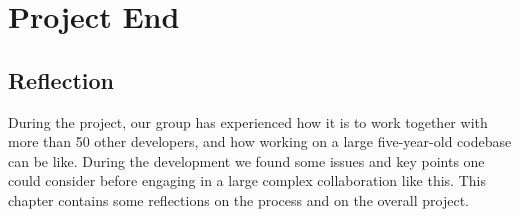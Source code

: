 \part{Project End}
\chapter{Reflection}
\label{cha:reflection}

During the \giraf project, our group has experienced how it is to work together with more than 50 other developers, and how working on a large five-year-old codebase can be like. During the development we found some issues and key points one could consider before engaging in a large complex collaboration like this. This chapter contains some reflections on the process and on the overall project.



